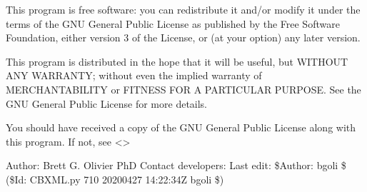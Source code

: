 \documentclass[letterpaper,12pt,english]{sphinxmanual}
\begin{document}
\sphinxAtStartPar
This program is free software: you can redistribute it and/or modify
it under the terms of the GNU General Public License as published by
the Free Software Foundation, either version 3 of the License, or
(at your option) any later version.

\sphinxAtStartPar
This program is distributed in the hope that it will be useful,
but WITHOUT ANY WARRANTY; without even the implied warranty of
MERCHANTABILITY or FITNESS FOR A PARTICULAR PURPOSE.  See the
GNU General Public License for more details.

\sphinxAtStartPar
You should have received a copy of the GNU General Public License
along with this program.  If not, see \textless{}\textgreater{}

\sphinxAtStartPar
Author: Brett G. Olivier PhD
Contact developers: 
Last edit: \$Author: bgoli \$ (\$Id: CBXML.py 710 2020\sphinxhyphen{}04\sphinxhyphen{}27 14:22:34Z bgoli \$)
\end{document}
